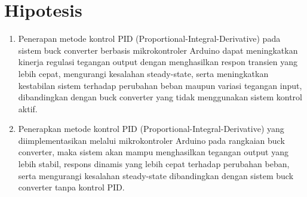 \section{Hipotesis}
\begin{enumerate}
	\item Penerapan metode kontrol PID (Proportional-Integral-Derivative) pada sistem buck converter berbasis mikrokontroler Arduino dapat meningkatkan kinerja regulasi tegangan output dengan menghasilkan respon transien yang lebih cepat, mengurangi kesalahan steady-state, serta meningkatkan kestabilan sistem terhadap perubahan beban maupun variasi tegangan input, dibandingkan dengan buck converter yang tidak menggunakan sistem kontrol aktif.
	\item Penerapkan metode kontrol PID (Proportional-Integral-Derivative) yang diimplementasikan melalui mikrokontroler Arduino pada rangkaian buck converter, maka sistem akan mampu menghasilkan tegangan output yang lebih stabil, respons dinamis yang lebih cepat terhadap perubahan beban, serta mengurangi kesalahan steady-state dibandingkan dengan sistem buck converter tanpa kontrol PID.
\end{enumerate}

